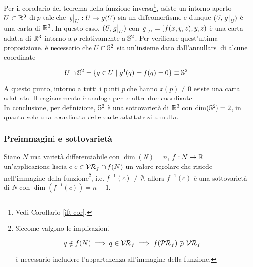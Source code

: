 Per il corollario del teorema della funzione inversa\footnote{%
	Vedi Corollario \ref{ift-cor}.%
}, esiste un intorno aperto $ U \subset \R^{3} $ di $ p $ tale che $ \eval{g}_{U} : U \to g(U) $ sia un diffeomorfismo e dunque $ (U,\eval{g}_{U}) $ è una carta di $ \R^{3} $. In questo caso, $ (U,\eval{g}_{U}) $ con $ \eval{g}_{U} = (f(x,y,z),y,z) $ è una carta adatta di $ \R^{3} $ intorno a $ p $ relativamente a $ \S^{2} $. Per verificare quest'ultima proposizione, è necessario che $ U \cap \S^{2} $ sia un'insieme dato dall'annullarsi di alcune coordinate:

\begin{equation}
	U \cap \S^{2} = \{ q \in U \mid g^{1}(q) = f(q) = 0 \} \equiv \S^{2}
\end{equation}

A questo punto, intorno a tutti i punti $ p $ che hanno $ x(p) \neq 0 $ esiste una carta adattata. Il ragionamento è analogo per le altre due coordinate.\\
In conclusione, per definizione, $ \S^{2}$ è una sottovarietà di $\R^{3} $ con $ \dim(\S^{2}) = 2 $, in quanto solo una coordinata delle carte adattate si annulla.

\subsubsection{Preimmagini e sottovarietà}

\begin{theorem}[Preimmagine di un valore regolare (caso $ M = \R $)]
	Siano $ N $ una varietà differenziabile con $ \dim(N) = n $, $ f : N \to \R $ un'applicazione liscia e $ c \in \VR_{f} \cap f(N) $ un valore regolare che risiede nell'immagine della funzione\footnote{%
		Siccome valgono le implicazioni
		
		\begin{equation*}
			q \notin f(N) \implies q \in \VR_{f} \implies f(\PR_{f}) \not\supset \VR_{f}
		\end{equation*}
	
		è necessario includere l'appartenenza all'immagine della funzione.%
	}, i.e. $ f^{-1}(c) \neq \emptyset $, allora $ f^{-1}(c) $ è una sottovarietà di $ N $ con $ \dim(f^{-1}(c)) = n-1 $.
\end{theorem}

